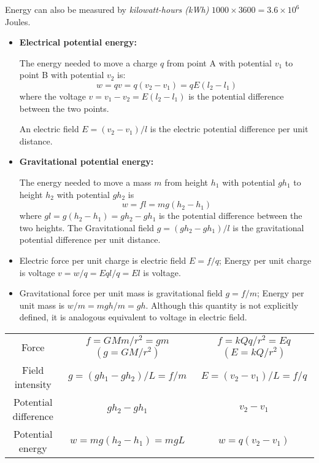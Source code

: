 \begin{itemize}
\begin{itemize}
  Energy can also be measured by {\em kilowatt-hours (kWh)} 
  $ 1000 \times 3600=3.6 \times 10^6 $ Joules.

  \begin{itemize}
  \item {\bf Electrical potential energy:}
    
    The energy needed to move a charge $q$ from point A with  potential 
    $v_1$ to point B with potential $v_2$ is:
    \[
    w=qv=q(v_2-v_1)=qE(l_2-l_1)
    \]
    where the voltage $v=v_1-v_2=E(l_2-l_1)$ is the potential difference
    between the two points.
  
    An electric field $E=(v_2-v_1)/l$ is the electric potential difference
    per unit distance.

  \item {\bf Gravitational potential energy:}

    The energy needed to move a mass $m$ from height $h_1$ with 
    potential $gh_1$ to height $h_2$ with potential $gh_2$ is 
    \[ 
    w=fl=mg(h_2-h_1)
    \]
    where $gl=g(h_2-h_1)=gh_2-gh_1$ is the potential difference between the 
    two heights.
    The Gravitational field $g=(gh_2-gh_1)/l$ is the gravitational potential
    difference per unit distance.

  \end{itemize}


  \begin{itemize}
  \item Electric force per unit charge is electric field $E=f/q$;
    Energy per unit charge is voltage $v=w/q=Eql/q=El$ is voltage.
  \item Gravitational force per unit mass is gravitational field $g=f/m$;
    Energy per unit mass is $w/m=mgh/m=gh$. Although this quantity is not
    explicitly defined, it is analogous equivalent to voltage in electric
    field.
  \end{itemize}

  \begin{tabular}{c||c|c}\hline
    Force & $f=GMm/r^2=gm$ $(g=GM/r^2)$ & $f=kQq/r^2=Eq$ $(E=kQ/r^2)$ \\
    Field intensity & $g=(gh_1-gh_2)/L=f/m$ & $E=(v_2-v_1)/L=f/q$ \\
    Potential difference & $gh_2-gh_1$ & $v_2-v_1$ \\
    Potential energy & $w=mg(h_2-h_1)=mgL$ & $w=q(v_2-v_1)$ \\
  \end{tabular}


\end{itemize}
\end{itemize}
